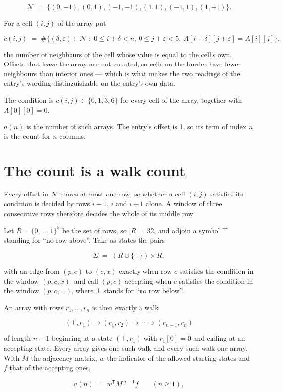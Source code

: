 \documentclass[11pt]{article}
\theoremstyle{definition}
\begin{document}
\[\mathcal{N} \;=\; \{(0,-1), (0,1), (-1,-1), (1,1), (-1,1), (1,-1)\}.\]

For a cell $(i,j)$ of the array put

\[c(i,j) \;=\; \#\bigl\{(\delta,\varepsilon)\in\mathcal{N} \;:\; 0\le i+\delta<n,\ 0\le j+\varepsilon<5,\ A[i+\delta][j+\varepsilon] = A[i][j]\bigr\},\]

the number of neighbours of the cell whose value is equal to the cell's own. Offsets that leave the array are not counted, so cells on the border have fewer neighbours than interior ones --- which is what makes the two readings of the entry's wording distinguishable on the entry's own data.

The condition is $c(i,j) \in \{0, 1, 3, 6\}$ for every cell of the array, together with $A[0][0]=0$.

$a(n)$ is the number of such arrays. The entry's offset is 1, so its term of index $n$ is the count for $n$ columns.

\section{The count is a walk count}

Every offset in $\mathcal{N}$ moves at most one row, so whether a cell $(i,j)$ satisfies its condition is decided by rows $i-1$, $i$ and $i+1$ alone. A window of three consecutive rows therefore decides the whole of its middle row.

Let $R = \{0,\dots,1\}^{5}$ be the set of rows, so $|R| = 32$, and adjoin a symbol $\top$ standing for ``no row above''. Take as states the pairs

\[\Sigma \;=\; (R \cup \{\top\}) \times R,\]

with an edge from $(p,c)$ to $(c,x)$ exactly when row $c$ satisfies the condition in the window $(p,c,x)$, and call $(p,c)$ accepting when $c$ satisfies the condition in the window $(p,c,\bot)$, where $\bot$ stands for ``no row below''.

An array with rows $r_1,\dots,r_n$ is then exactly a walk

\[(\top,r_1) \to (r_1,r_2) \to \cdots \to (r_{n-1},r_n)\]

of length $n-1$ beginning at a state $(\top,r_1)$ with $r_1[0]=0$ and ending at an accepting state. Every array gives one such walk and every such walk one array. With $M$ the adjacency matrix, $w$ the indicator of the allowed starting states and $f$ that of the accepting ones,

\[a(n) \;=\; w^{\mathsf T} M^{\,n-1} f \qquad (n \ge 1),\]
\end{document}
